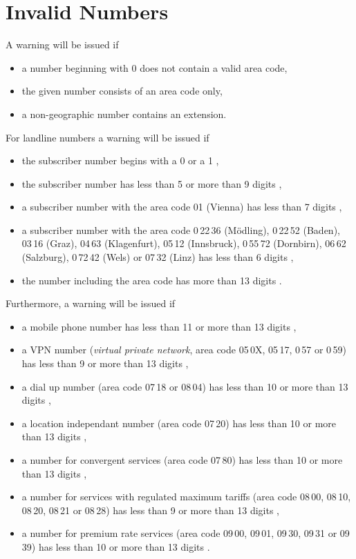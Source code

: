 \documentclass[numbers=noenddot]{scrreprt}
\newcommand{\UeberschriftUngueltig}{\section{Invalid Numbers}}
\newcommand{\WarnungWenn}{A warning will be issued if}
\begin{document}
\UeberschriftUngueltig
\WarnungWenn
\begin{itemize}
\item a number beginning with 0 does not contain a valid area code,
\item the given number consists of an area code only,
\item a non-geographic number contains an extension.
\end{itemize}
For landline numbers a warning will be issued if
\begin{itemize}
\item the subscriber number begins with a 0 or a 1 \cite[§\,50 (9)]{RTR-Verordnung},
\item the subscriber number has less than 5 or more than 9 digits \cite[§\,50 (3) and (5)]{RTR-Verordnung},
\item a subscriber number with the area code 01 (Vienna) has less than 7 digits \cite[§\,50 (4)]{RTR-Verordnung},
\item a subscriber number with the area code
0\,22\,36 (Mödling), 0\,22\,52 (Baden), 03\,16 (Graz), 04\,63 (Klagenfurt), 05\,12 (Innsbruck), 0\,55\,72 (Dornbirn), 06\,62 (Salzburg), 0\,72\,42 (Wels) or 07\,32 (Linz)
has less than 6 digits \cite[§\,50 (4)]{RTR-Verordnung},
\item the number including the area code has more than 13 digits \cite[§\,50 (5)]{RTR-Verordnung}.
\end{itemize}
Furthermore, a warning will be issued if
\begin{itemize}
\item a mobile phone number has less than 11 or more than 13 digits \cite[§\,61 (1)]{RTR-Verordnung},
\item a VPN number (\emph{virtual private network}, area code
05\,0X, 05\,17, 0\,57 or 0\,59)
has less than 9 or more than 13 digits \cite[§\,56 (1) and §\,4 (4)]{RTR-Verordnung},
\item a dial up number (area code
07\,18 or 08\,04)
has less than 10 or more than 13 digits \cite[§\,66]{RTR-Verordnung},
\item a location independant number (area code
07\,20)
has less than 10 or more than 13 digits \cite[§\,71]{RTR-Verordnung},
\item a number for convergent services (area code
07\,80)
has less than 10 or more than 13 digits \cite[§\,76]{RTR-Verordnung},
\item a number for services with regulated maximum tariffs (area code
08\,00, 08\,10, 08\,20, 08\,21 or 08\,28)
has less than 9 or more than 13 digits \cite[§\,81]{RTR-Verordnung},
\item a number for premium rate services (area code
09\,00, 09\,01, 09\,30, 09\,31 or 09\,39)
has less than 10 or more than 13 digits \cite[§\,87]{RTR-Verordnung}.
\end{itemize}
\end{document}
